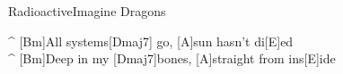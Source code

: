 \begin{song}{Radioactive}{Imagine Dragons }
\vspace{3mm}


\vspace{3mm}
\begin{guitar}
^ [Bm]All systems[Dmaj7] go, [A]sun hasn't di[E]ed\\
^ [Bm]Deep in my [Dmaj7]bones, [A]straight from ins[E]ide\\
\end{guitar}

\vspace{3mm}


\end{song}
